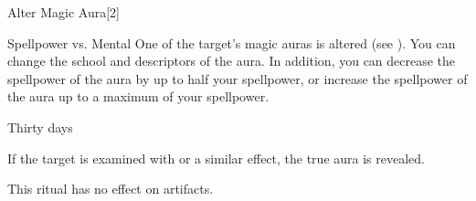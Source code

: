 \begin{spellsection}{Alter Magic Aura}[2]
    \begin{spellheader}
    \end{spellheader}
    \begin{spellcontent}
        \begin{spelltargetinginfo}
        \end{spelltargetinginfo}
        \begin{spelleffects}
            \begin{spellattack}{Spellpower vs. Mental}
                \spellsuccess One of the target's magic auras is altered (see ). You can change the school and descriptors of the aura. In addition, you can decrease the spellpower of the aura by up to half your spellpower, or increase the spellpower of the aura up to a maximum of your spellpower.
            \end{spellattack}
            \spelldur Thirty days \dismissable
        \end{spelleffects}
    \end{spellcontent}
    \begin{spellfooter}
        \spellnotes If the target is examined with  or a similar effect, the true aura is revealed.

        \par This ritual has no effect on artifacts.
    \end{spellfooter}
    \begin{spellaugments}
    \end{spellaugments}
\end{spellsection}

